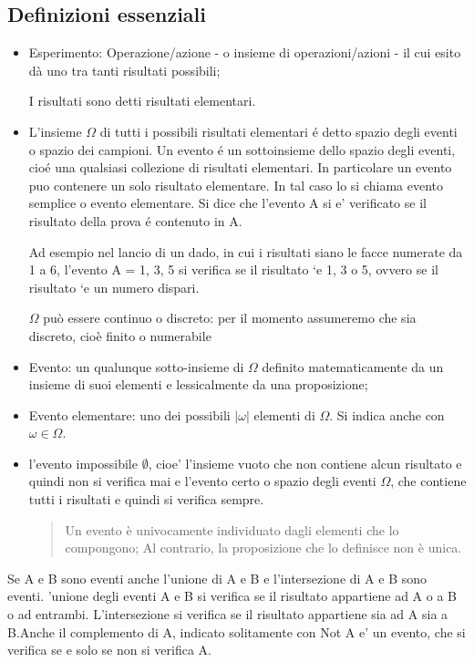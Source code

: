\subsection{Definizioni essenziali}
\begin{itemize}
\item Esperimento: Operazione/azione - o insieme di operazioni/azioni - il
cui esito dà uno tra tanti risultati possibili; 

I risultati sono detti risultati elementari.

\item L'insieme $\Omega$ di tutti i possibili risultati elementari é detto spazio degli eventi o spazio dei campioni. Un evento é un sottoinsieme dello spazio degli eventi, cioé una qualsiasi collezione di risultati elementari.
In particolare un evento puo contenere un solo risultato elementare. 
In tal caso lo si chiama evento semplice o evento elementare. Si dice che l'evento A si e' verificato se il risultato della prova é contenuto in A.

Ad esempio nel lancio di un dado, in cui i risultati siano le facce numerate da 1 a 6, l’evento
A = {1, 3, 5} si verifica se il risultato `e 1, 3 o 5, ovvero se il risultato `e un numero dispari.
    
$\Omega$ può essere continuo o discreto: per il momento assumeremo che
sia discreto, cioè finito o numerabile

\item Evento: un qualunque sotto-insieme di $\Omega$ definito matematicamente
da un insieme di suoi elementi e lessicalmente da una proposizione;

\item Evento elementare: uno dei possibili $|\omega|$ elementi di $\Omega$. Si indica
anche con $\omega \in \Omega$.

\item  l’evento impossibile $\emptyset$, cioe' l’insieme vuoto che non contiene alcun risultato
e quindi non si verifica mai e l’evento certo o spazio degli eventi $\Omega$, che contiene tutti i
risultati e quindi si verifica sempre.

\begin{quote} 
    Un evento è univocamente individuato dagli elementi che lo
compongono;
Al contrario, la proposizione che lo definisce non è unica.
\end{quote}
\end{itemize}

Se A e B sono eventi anche l’unione di A e B e l’intersezione di A e B sono eventi. ’unione degli eventi A e B si verifica se il risultato appartiene ad A o a B o ad
entrambi. L’intersezione si verifica se il risultato appartiene sia ad A sia a B.Anche il complemento di A, indicato solitamente con Not A e'  un evento, che si verifica se e
solo se non si verifica A.

